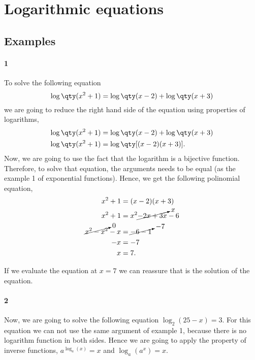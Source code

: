 \documentclass[../main.tex]{subfiles}
\begin{document}
\section{Logarithmic equations}

\subsection{Examples}

\paragraph{1} To solve the following equation \[\log\qty(x^2+1)=\log\qty(x-2) + \log\qty(x+3)\] 
we are going to reduce the right hand side of the equation using properties of logarithms,
\begin{align*}
    \log\qty(x^2+1) &= \log\qty(x-2) + \log\qty(x+3) \\
    \log\qty(x^2+1) &= \log\qty[(x-2)(x+3)].
\end{align*}
Now, we are going to use the fact that the logarithm is a bijective function.
Therefore, to solve that equation, the arguments needs to be equal (as the example 1 of exponential functions).
Hence, we get the following polinomial equation,
\begin{align*}
    x^2+1 &= (x-2)(x+3) \\
    x^2+1 &= x^2\cancelto{x}{-2x+3x}-6 \\
    \cancelto{0}{x^2-x^2}-x &= \cancelto{-7}{-6-1} \\
-x &= -7 \\
    x &= 7.
\end{align*}

If we evaluate the equation at $x=7$ we can reassure that is the solution of the equation.

\paragraph{2} Now, we are going to solve the following equation $\log_2(25-x)=3$.
For this equation we can not use the same argument of example 1, because there is no logarithm function in both sides.
Hence we are going to apply the property of inverse functions, $a^{\log_a(x)}=x$ and $\log_a(a^x)=x$.
\end{document}
